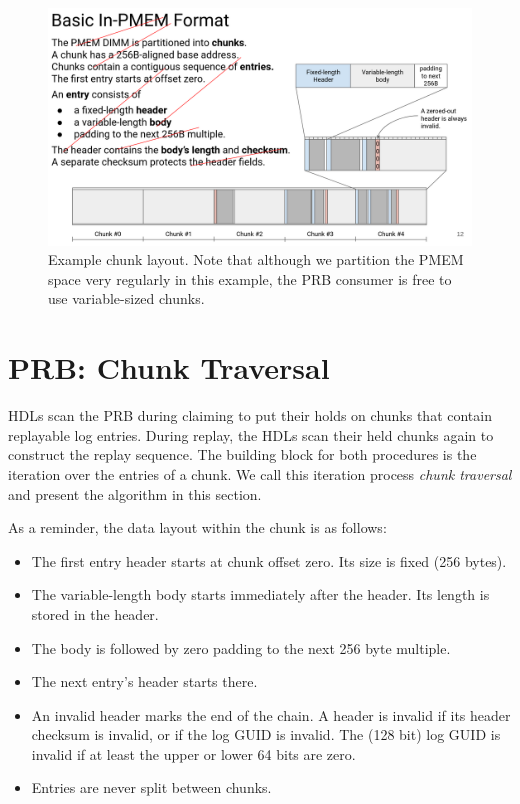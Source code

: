 \documentclass[12pt,a4paper,twoside]{book}
\begin{document}
\begin{figure}[H]
    \centering
    \includegraphics{fig/prb_persistent_structure__chunklayout}
    \caption{Example chunk layout. Note that although we partition the PMEM space very regularly in this example, the PRB consumer is free to use variable-sized chunks.}
    \label{fig:prb_physical_data_structure__chunklayout}
\end{figure}


\section{PRB: Chunk Traversal}\label{di:prb:traversal}
HDLs scan the PRB during claiming to put their holds on chunks that contain replayable log entries.
During replay, the HDLs scan their held chunks again to construct the replay sequence.
The building block for both procedures is the iteration over the entries of a chunk.
We call this iteration process \textit{chunk traversal} and present the algorithm in this section.

As a reminder, the data layout within the chunk is as follows:
\begin{itemize}[noitemsep]
    \item The first entry header starts at chunk offset zero. Its size is fixed (256 bytes).
    \item The variable-length body starts immediately after the header. Its length is stored in the header.
    \item The body is followed by zero padding to the next 256 byte multiple.
    \item The next entry's header starts there.
    \item An invalid header marks the end of the chain.
        A header is invalid if its header checksum is invalid, or if the log GUID is invalid.
        The (128 bit) log GUID is invalid if at least the upper or lower 64 bits are zero.
    \item Entries are never split between chunks.
\end{itemize}
\end{document}
